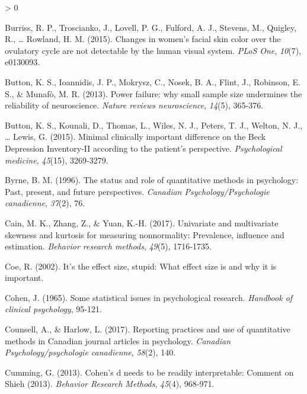 \documentclass[
  12pt,
  french,
]{article}
\newlength{\cslhangindent}
\newenvironment{CSLReferences}[2] %
 {%
  \setlength{\parindent}{0pt}
  \ifodd #1 \everypar{\setlength{\hangindent}{\cslhangindent}}\ignorespaces\fi
  \ifnum #2 > 0
  \setlength{\parskip}{#2\baselineskip}
  \fi
 }%
 {}
\begin{document}
\begin{CSLReferences}{1}{0}
\leavevmode\hypertarget{ref-burriss_changes_2015}{}%
Burriss, R. P., Troscianko, J., Lovell, P. G., Fulford, A. J., Stevens,
M., Quigley, R., \ldots{} Rowland, H. M. (2015). Changes in women's
facial skin color over the ovulatory cycle are not detectable by the
human visual system. \emph{{PLoS} One}, \emph{10}(7), e0130093.

\leavevmode\hypertarget{ref-button_power_2013}{}%
Button, K. S., Ioannidis, J. P., Mokrysz, C., Nosek, B. A., Flint, J.,
Robinson, E. S., \& Munafò, M. R. (2013). Power failure: why small
sample size undermines the reliability of neuroscience. \emph{Nature
reviews neuroscience}, \emph{14}(5), 365‑376.

\leavevmode\hypertarget{ref-button_minimal_2015}{}%
Button, K. S., Kounali, D., Thomas, L., Wiles, N. J., Peters, T. J.,
Welton, N. J., \ldots{} Lewis, G. (2015). Minimal clinically important
difference on the Beck Depression Inventory-{II} according to the
patient's perspective. \emph{Psychological medicine}, \emph{45}(15),
3269‑3279.

\leavevmode\hypertarget{ref-byrne_status_1996}{}%
Byrne, B. M. (1996). The status and role of quantitative methods in
psychology: Past, present, and future perspectives. \emph{Canadian
Psychology/Psychologie canadienne}, \emph{37}(2), 76.

\leavevmode\hypertarget{ref-cain_univariate_2017}{}%
Cain, M. K., Zhang, Z., \& Yuan, K.-H. (2017). Univariate and
multivariate skewness and kurtosis for measuring nonnormality:
Prevalence, influence and estimation. \emph{Behavior research methods},
\emph{49}(5), 1716‑1735.

\leavevmode\hypertarget{ref-coe_its_2002}{}%
Coe, R. (2002). It's the effect size, stupid: What effect size is and
why it is important.

\leavevmode\hypertarget{ref-cohen_statistical_1965}{}%
Cohen, J. (1965). Some statistical issues in psychological research.
\emph{Handbook of clinical psychology}, 95‑121.

\leavevmode\hypertarget{ref-counsell_reporting_2017}{}%
Counsell, A., \& Harlow, L. (2017). Reporting practices and use of
quantitative methods in Canadian journal articles in psychology.
\emph{Canadian Psychology/psychologie canadienne}, \emph{58}(2), 140.

\leavevmode\hypertarget{ref-cumming_cohens_2013}{}%
Cumming, G. (2013). Cohen's d needs to be readily interpretable: Comment
on Shieh (2013). \emph{Behavior Research Methods}, \emph{45}(4),
968‑971.


\end{CSLReferences}
\end{document}
